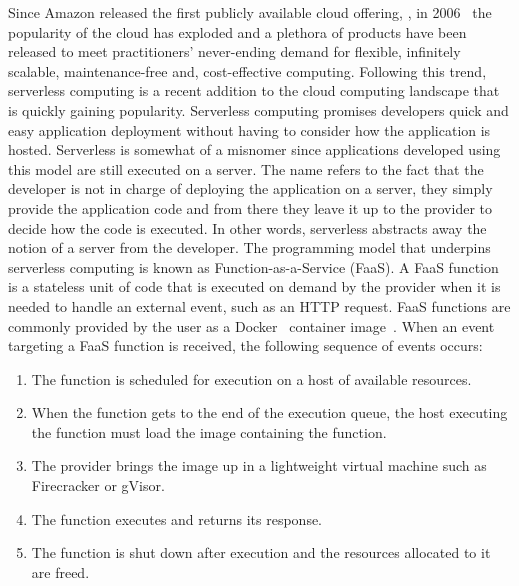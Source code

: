 \documentclass[../main.tex]{subfiles}
\begin{document}
\begin{refsection}
Since Amazon released the first publicly available cloud offering,
, in 2006~\cite{qian2009cloud} the popularity of
the cloud has exploded and a plethora of products have been released
to meet practitioners' never-ending demand for flexible, infinitely
scalable, maintenance-free and, cost-effective computing. Following
this trend, serverless computing is a recent addition to the cloud
computing landscape that is quickly gaining popularity. Serverless
computing promises developers quick and easy application deployment
without having to consider how the application is hosted. Serverless
is somewhat of a misnomer since applications developed using this
model are still executed on a server. The name refers to the fact that
the developer is not in charge of deploying the application on a
server, they simply provide the application code and from there they
leave it up to the provider to decide how the code is executed. In other
words, serverless abstracts away the notion of a server from the
developer. The programming model that underpins serverless computing
is known as Function-as-a-Service (FaaS). A FaaS function is a
stateless unit of code that is executed on demand by the provider when
it is needed to handle an external event, such as an HTTP request. FaaS
functions are commonly provided by the user as a Docker~\cite{docker}
container image~\cite{serverless_state}. When an event targeting a
FaaS function is received, the following sequence of events occurs:
\begin{enumerate}
\item The function is scheduled for execution on a host of available resources.
\item When the function gets to the end of the execution queue, the host executing the function must load the image containing the function.
\item The provider brings the image up in a lightweight virtual machine such as Firecracker or gVisor.
\item The function executes and returns its response.
\item The function is shut down after execution and the resources
  allocated to it are freed.
\end{enumerate}




\end{refsection}
\end{document}
